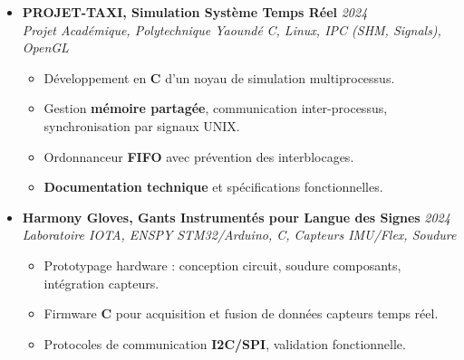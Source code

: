 \documentclass[a4paper,11pt]{article}
\begin{document}
\begin{itemize}[leftmargin=*, label={-}]
\item \textbf{PROJET-TAXI, Simulation Système Temps Réel} \hfill \textit{2024} \\
\textit{Projet Académique, Polytechnique Yaoundé} \hfill \textit{C, Linux, IPC (SHM, Signals), OpenGL}
\vspace{-2pt}
    \begin{itemize}[leftmargin=0.4cm, nosep, label=\tiny$\bullet$]
        \item \small{Développement en \textbf{C} d'un noyau de simulation multiprocessus.}
        \item \small{Gestion \textbf{mémoire partagée}, communication inter-processus, synchronisation par signaux UNIX.}
        \item \small{Ordonnanceur \textbf{FIFO} avec prévention des interblocages.}
        \item \small{\textbf{Documentation technique} et spécifications fonctionnelles.}
    \end{itemize}
\vspace{3pt}

\item \textbf{Harmony Gloves, Gants Instrumentés pour Langue des Signes} \hfill \textit{2024} \\
\textit{Laboratoire IOTA, ENSPY} \hfill \textit{STM32/Arduino, C, Capteurs IMU/Flex, Soudure}
\vspace{-2pt}
    \begin{itemize}[leftmargin=0.4cm, nosep, label=\tiny$\bullet$]
        \item \small{Prototypage hardware : conception circuit, soudure composants, intégration capteurs.}
        \item \small{Firmware \textbf{C} pour acquisition et fusion de données capteurs temps réel.}
        \item \small{Protocoles de communication \textbf{I2C/SPI}, validation fonctionnelle.}
    \end{itemize}

\end{itemize}

\end{document}
